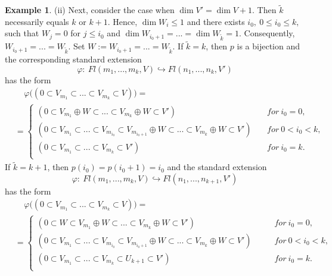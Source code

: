 \documentclass[12pt]{amsart}
\renewcommand{\phi}{\varphi}
\theoremstyle{definition}
\newtheorem{example}[theorem]{Example}
\begin{document}
\begin{example}
(ii) Next, consider the case when $\dim V'=\dim V+1$. Then
$\tilde{k}$ necessarily equals $k$ or $k+1$. Hence, $\dim 
W_i\le1$ and there exists $i_0,\ 0\le i_0\le k,$ such that 
$W_j=0$ for $j\le i_0$ and $\dim W_{i_0+1}=...=\dim 
W_{\tilde{k}}=1$. Consequently, $W_{i_0+1}=...=
W_{\tilde{k}}$. Set $W:=W_{i_0+1}=...=W_{\tilde{k}}$. If 
$\tilde{k}=k$, then $p$ is a bijection and the corresponding 
standard extension 
$$\phi:\ Fl(m_1,...,m_k,V)\hookrightarrow Fl(n_1,...,n_k,V')
$$ 
has the form
\begin{equation}\label{example of st ext}
\begin{split}
&\ \ \ \ \ \varphi\Big((0\subset V_{m_1}\subset...\subset 
V_{m_k}\subset V)\Big)=\\
& =\left\{ 
\begin{aligned}
(0\subset V_{m_1}\oplus W\subset...\subset V_{m_k}\oplus W\subset V')\ \ \ \ \ \ \ \ \ \ \ \ \ \ \ \ \ \ \ \ \ \ \ \ \ \
\ \ \ & &\ for\ i_0=0,\\ 
(0\subset V_{m_1}\subset...\subset V_{m_{i_0}}\subset V_{m
_{i_0+1}}\oplus W\subset...\subset V_{m_k}\oplus W\subset V')
 & &\ for\ 0<i_0<k,\\ 
(0\subset V_{m_1}\subset...\subset V_{m_k}\subset V')
\ \ \ \ \ \ \ \ \ \ \ \ \ \ \ \ \ \ \ \ \ \ \ \ \ \ \ \ \ \ \ \ \ \ \ \ \ \ \ \ \ \  & &
\ for\ i_0=k.\\ 
\end{aligned} 
\right.
\end{split}
\end{equation}
If $\tilde{k}=k+1$, then $p(i_0)=p(i_0+1)=i_0$ and the 
standard extension 
$$
\varphi:\ Fl(m_1,...,m_k,V)\hookrightarrow Fl(n_1,...,
n_{k+1},V')
$$ 
has the form
\begin{equation}\label{example of st ext2}
\begin{split}
&\ \ \ \ \ \varphi\Big((0\subset V_{m_1}\subset...\subset 
V_{m_k}\subset V)\Big)=\\
& =\left\{ 
\begin{aligned}
(0\subset W\subset V_{m_1}\oplus W\subset...\subset V_{m_k}\oplus W\subset V')\ \ \ \ \ \ \ \ \ \ \ \ \ \ \ \ \ \ \ \ \ \ \ \ \  & &\ for\ i_0=0,\\ 
(0\subset V_{m_1}\subset...\subset V_{m_{i_0}}\subset V_{m
_{i_0+1}}\oplus W\subset...\subset V_{m_k}\oplus W\subset V')
\ \ \ \  & &\ for\ 0<i_0<k,\\ 
(0\subset V_{m_1}\subset...\subset V_{m_k} \subset 
U_{k+1}\subset V')
\ \ \ \ \ \ \ \ \ \ \ \ \ \ \ \ \ \ \ \ \ \ \ \ \ \ \ \ \ \  & &
\ for\ i_0=k.\\ 
\end{aligned} 
\right.
\end{split}
\end{equation}


\end{example}
\end{document}
